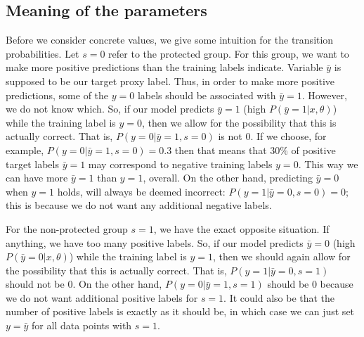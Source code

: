 \subsection{Meaning of the parameters}
Before we consider concrete values, we give some intuition for the transition probabilities.
Let $s=0$ refer to the protected group.
For this group, we want to make more positive predictions than the training labels indicate.
Variable $\bar{y}$ is supposed to be our target proxy label.
Thus, in order to make more positive predictions, some of the $y=0$ labels should be associated with $\bar{y}=1$.
However, we do not know which.
So, if our model predicts $\bar{y} = 1$ (high $P(\bar{y}=1|x,\theta)$) while the training label is $y=0$,
then we allow for the possibility that this is actually correct.
That is, $P(y=0|\bar{y}=1,s=0)$ is not $0$.
If we choose, for example, $P(y=0|\bar{y}=1,s=0)=0.3$
then that means that 30\% of positive target labels $\bar{y} =1$ may correspond to negative training labels $y=0$.
This way we can have more $\bar{y}=1$ than $y=1$, overall.
On the other hand, predicting $\bar{y}=0$ when $y=1$ holds, will always be deemed incorrect:
$P(y=1|\bar{y}=0,s=0)=0$;
this is because we do not want any additional negative labels.

For the non-protected group $s=1$, we have the exact opposite situation.
If anything, we have too many positive labels.
So, if our model predicts $\bar{y} = 0$ (high $P(\bar{y}=0|x,\theta)$) while the training label is $y=1$,
then we should again allow for the possibility that this is actually correct.
That is, $P(y=1|\bar{y}=0,s=1)$ should not be $0$.
On the other hand, $P(y=0|\bar{y}=1,s=1)$ should be $0$ because we do not want additional positive labels for $s=1$.
It could also be that the number of positive labels is exactly as it should be,
in which case we can just set $y=\bar{y}$ for all data points with $s=1$.


